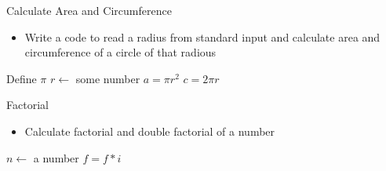 \documentclass[10pt,t]{beamer}
\begin{document}
\begin{frame}{Calculate Area and Circumference}
  \begin{itemize}
  \item Write a code to read a radius from standard input and calculate area and circumference of a circle of that radious
  \end{itemize}
  \begin{algorithm}[H]
    \caption{Pseudo code for calculating area and circumference} 
    \begin{algorithmic}
      \State Define $\pi$
      \State $r \gets$ some number
      \State $a = \pi{}r^2$
      \State $c = 2\pi{}r$
    \end{algorithmic}
  \end{algorithm}
\end{frame}

\begin{frame}{Factorial}
  \begin{itemize}
  \item Calculate factorial and double factorial of a number
  \end{itemize}
  \begin{algorithm}[H]
    \caption{Pseudo Code for Factorial}
    \begin{algorithmic}
      \State $n \gets$ a number
      \State $f = f * i$
      \EndDo
    \end{algorithmic}
  \end{algorithm}
\end{frame}
  
\end{document}
